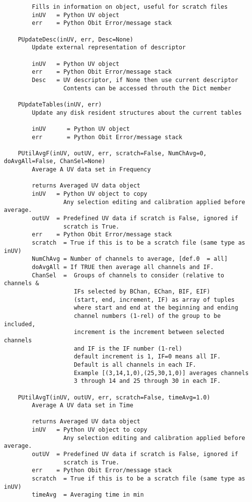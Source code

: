 \documentclass[11pt]{report}
\begin{document}
\begin{verbatim}
        Fills in information on object, useful for scratch files
        inUV   = Python UV object
        err    = Python Obit Error/message stack
    
    PUpdateDesc(inUV, err, Desc=None)
        Update external representation of descriptor
        
        inUV   = Python UV object
        err    = Python Obit Error/message stack
        Desc   = UV descriptor, if None then use current descriptor
                 Contents can be accessed throuth the Dict member
    
    PUpdateTables(inUV, err)
        Update any disk resident structures about the current tables
        
        inUV      = Python UV object
        err       = Python Obit Error/message stack
    
    PUtilAvgF(inUV, outUV, err, scratch=False, NumChAvg=0, doAvgAll=False, ChanSel=None)
        Average A UV data set in Frequency
        
        returns Averaged UV data object
        inUV   = Python UV object to copy
                 Any selection editing and calibration applied before average.
        outUV  = Predefined UV data if scratch is False, ignored if
                 scratch is True.
        err    = Python Obit Error/message stack
        scratch  = True if this is to be a scratch file (same type as inUV)
        NumChAvg = Number of channels to average, [def.0  = all]
        doAvgAll = If TRUE then average all channels and IF.
        ChanSel  =  Groups of channels to consider (relative to channels &
                    IFs selected by BChan, EChan, BIF, EIF)
                    (start, end, increment, IF) as array of tuples
                    where start and end at the beginning and ending
                    channel numbers (1-rel) of the group to be included,
                    increment is the increment between selected channels
                    and IF is the IF number (1-rel)
                    default increment is 1, IF=0 means all IF.
                    Default is all channels in each IF.
                    Example [(3,14,1,0),(25,30,1,0)] averages channels
                    3 through 14 and 25 through 30 in each IF.
    
    PUtilAvgT(inUV, outUV, err, scratch=False, timeAvg=1.0)
        Average A UV data set in Time
        
        returns Averaged UV data object
        inUV   = Python UV object to copy
                 Any selection editing and calibration applied before average.
        outUV  = Predefined UV data if scratch is False, ignored if
                 scratch is True.
        err    = Python Obit Error/message stack
        scratch  = True if this is to be a scratch file (same type as inUV)
        timeAvg  = Averaging time in min
    

\end{verbatim}
\end{document}

